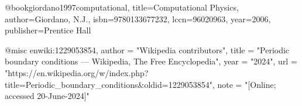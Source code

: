 @book{giordano1997computational,
  title={Computational Physics},
  author={Giordano, N.J.},
  isbn={9780133677232},
  lccn={96020963},
  year={2006},
  publisher={Prentice Hall}
}

@misc{ enwiki:1229053854,
author = "{Wikipedia contributors}",
title = "Periodic boundary conditions --- {Wikipedia}{,} The Free Encyclopedia",
year = "2024",
url = "https://en.wikipedia.org/w/index.php?title=Periodic_boundary_conditions&oldid=1229053854",
note = "[Online; accessed 20-June-2024]"
}